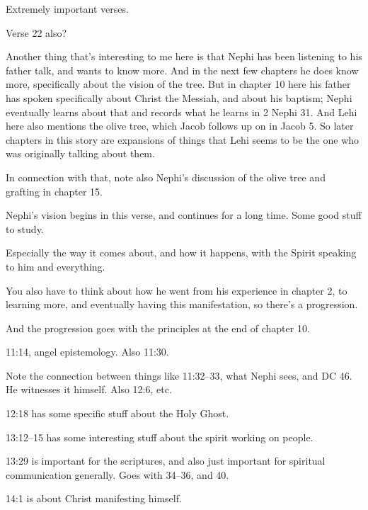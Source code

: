 \begin{compactdesc}
				\begin{compactitem}
					\item Extremely important verses.
					\item Verse 22 also?
					\item Another thing that's interesting to me here is that Nephi has been listening to his father talk, and wants to know more. And in the next few chapters he does know more, specifically about the vision of the tree. But in chapter 10 here his father has spoken specifically about Christ the Messiah, and about his baptism; Nephi eventually learns about that and records what he learns in 2 Nephi 31. And Lehi here also mentions the olive tree, which Jacob follows up on in Jacob 5. So later chapters in this story are expansions of things that Lehi seems to be the one who was originally talking about them.
					\item In connection with that, note also Nephi's discussion of the olive tree and grafting in chapter 15.
				\end{compactitem}
			\item[{\hyperref[1NEPHI-11-1]{1 Nephi 11:1}}] \phantom{.}
				\begin{compactitem}
					\item Nephi's vision begins in this verse, and continues for a long time. Some good stuff to study.
					\item Especially the way it comes about, and how it happens, with the Spirit speaking to him and everything.
					\item You also have to think about how he went from his experience in chapter 2, to learning more, and eventually having this manifestation, so there's a progression.
					\item And the progression goes with the principles at the end of chapter 10.
					\item 11:14, angel epistemology. Also 11:30.
					\item Note the connection between things like 11:32--33, what Nephi sees, and DC 46. He witnesses it himself. Also 12:6, etc.
					\item 12:18 has some specific stuff about the Holy Ghost.
					\item 13:12--15 has some interesting stuff about the spirit working on people.
					\item 13:29 is important for the scriptures, and also just important for spiritual communication generally. Goes with 34--36, and 40.
					\item 14:1 is about Christ manifesting himself.

\end{compactitem}
\end{compactdesc}
